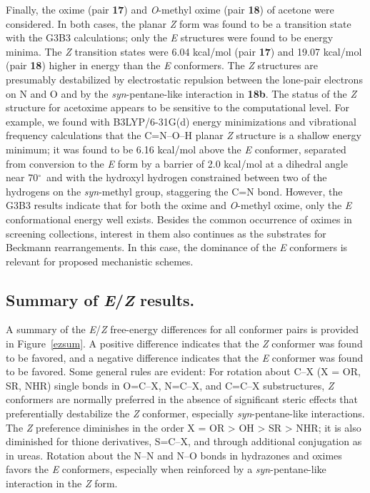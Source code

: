 \documentclass[12pt]{report}
\def\deg{$^{\circ}$}
\def\figlab{Figure}\def\figslab{\figlab s}
\newcommand*\fig[1]{\figlab~\ref{#1}}
\begin{document}
Finally, the oxime (pair \textbf{17}) and \textit{O}-methyl oxime (pair \textbf{18}) of acetone were considered. In both cases, the planar \textit{Z} form was found to be a transition state with the G3B3 calculations; only the \textit{E} structures were found to be energy minima. The \textit{Z} transition states were 6.04 kcal/mol (pair \textbf{17}) and 19.07 kcal/mol (pair \textbf{18}) higher in energy than the \textit{E} conformers. The \textit{Z} structures are presumably destabilized by electrostatic repulsion between the lone-pair electrons on N and O and by the \textit{syn}-pentane-like interaction in \textbf{18b}. The status of the \textit{Z} structure for acetoxime appears to be sensitive to the computational level. For example, we found with B3LYP/6-31G(d) energy minimizations and vibrational frequency calculations that the C=N--O--H planar \textit{Z} structure is a shallow energy minimum; it was found to be 6.16 kcal/mol above the \textit{E} conformer, separated from conversion to the \textit{E} form by a barrier of 2.0 kcal/mol at a dihedral angle near 70\deg\ and with the hydroxyl hydrogen constrained between two of the hydrogens on the \textit{syn}-methyl group, staggering the C=N bond. However, the G3B3 results indicate that for both the oxime and \textit{O}-methyl oxime, only the \textit{E} conformational energy well exists. Besides the common occurrence of oximes in screening collections, interest in them also continues as the substrates for Beckmann rearrangements. In this case, the dominance of the \textit{E} conformers is relevant for proposed mechanistic schemes.\cite{yam}


\subsection{Summary of \textit{E}/\textit{Z} results.}

A summary of the \textit{E}/\textit{Z} free-energy differences for all conformer pairs is provided in \fig{ezsum}. A positive difference indicates that the \textit{Z} conformer was found to be favored, and a negative difference indicates that the \textit{E} conformer was found to be favored. Some general rules are evident: For rotation about C--X (X = OR, SR, NHR) single bonds in O=C--X, N=C--X, and C=C--X substructures, \textit{Z} conformers are normally preferred in the absence of significant steric effects that preferentially destabilize the \textit{Z} conformer, especially \textit{syn}-pentane-like interactions. The \textit{Z} preference diminishes in the order X = OR > OH > SR > NHR; it is also diminished for thione derivatives, S=C--X, and through additional conjugation as in ureas. Rotation about the N--N and N--O bonds in hydrazones and oximes favors the \textit{E} conformers, especially when reinforced by a \textit{syn}-pentane-like interaction in the \textit{Z} form.
\end{document}
